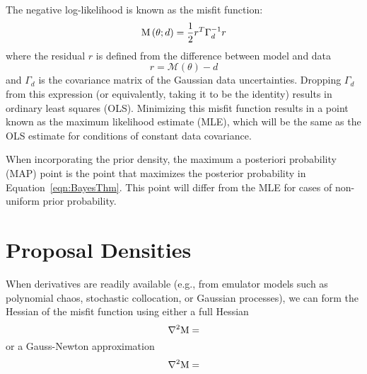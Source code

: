 The negative log-likelihood is known as the misfit function:
\begin{equation}
  {\text M}\left( {\theta ;d} \right) = \frac{1}{2} r^T \Gamma_d^{-1} r
\end{equation}
where the residual $r$ is defined from the difference between model 
and data
\begin{equation}
r = \mathcal{M}(\theta) - d
\end{equation}
and $\Gamma_d$ is the covariance matrix of the Gaussian data
uncertainties.  Dropping $\Gamma_d$ from this expression (or
equivalently, taking it to be the identity) results in ordinary least
squares (OLS).  Minimizing this misfit function results in a point 
known as the maximum likelihood estimate (MLE), which will be the
same as the OLS estimate for conditions of constant data covariance.

When incorporating the prior density, the maximum a posteriori
probability (MAP) point is the point that maximizes the posterior
probability in Equation~\ref{eqn:BayesThm}.  This point will differ
from the MLE for cases of non-uniform prior probability.

\section{Proposal Densities} \label{uq:bayes:prop}

When derivatives are readily available (e.g., from emulator models such
as polynomial chaos, stochastic collocation, or Gaussian processes),
we can form the Hessian of the misfit function using either a full
Hessian 
\begin{equation}
\nabla^2 {\text M} = 
\end{equation}
or a Gauss-Newton approximation\begin{equation}
\nabla^2 {\text M} = 
\end{equation}
